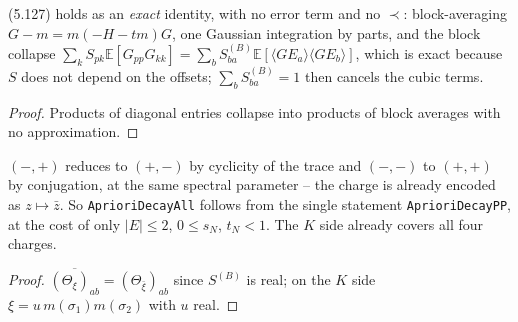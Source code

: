 \begin{lemma}\label{lem:eq527}
  \leanok{}
  (5.127) holds as an \emph{exact} identity, with no error term and no $\prec$: block-averaging
  $G-m=m(-H-tm)G$, one Gaussian integration by parts, and the block collapse
  $\sum_kS_{pk}\mathbb E[G_{pp}G_{kk}]=\sum_bS^{(B)}_{ba}\mathbb E[\langle GE_a\rangle\langle
  GE_b\rangle]$, which is exact because $S$ does not depend on the offsets; $\sum_bS^{(B)}_{ba}=1$
  then cancels the cubic terms.
\end{lemma}
\begin{proof}\leanok
  Products of diagonal entries collapse into products of block averages with no approximation.
\end{proof}

\begin{lemma}\label{lem:chargereduce}
  \leanok{}
  $(-,+)$ reduces to $(+,-)$ by cyclicity of the trace and $(-,-)$ to $(+,+)$ by conjugation, at the
  same spectral parameter -- the charge is already encoded as $z\mapsto\bar z$. So
  \texttt{AprioriDecayAll} follows from the single statement \texttt{AprioriDecayPP}, at the cost of
  only $|E|\le2$, $0\le s_N$, $t_N<1$. The $K$ side already covers all four charges.
\end{lemma}
\begin{proof}\leanok
  $\overline{(\Theta_\xi)_{ab}}=(\Theta_{\bar\xi})_{ab}$ since $S^{(B)}$ is real; on the $K$ side
  $\xi=u\,m(\sigma_1)m(\sigma_2)$ with $u$ real.
\end{proof}

